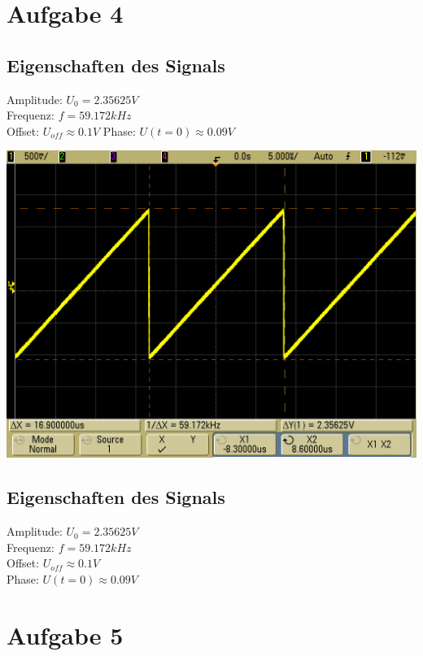\documentclass[compress,11pt]{beamer}
\begin{document}
\section{Aufgabe 4}
\begin{frame}
\subsection{Eigenschaften des Signals}
Amplitude: $U_0 = 2.35625 V$ \\
Frequenz: $f = 59.172 kHz$ \\
Offset: $U_{off} \approx 0.1 V$
Phase: $U(t=0) \approx 0.09 V$\
\end{frame}

\begin{frame}
\includegraphics[width=\textwidth]{images/scope_13}
\end{frame}
\begin{frame}
\subsection{Eigenschaften des Signals}
Amplitude: $U_0 = 2.35625 V$ \\
Frequenz: $f = 59.172 kHz$ \\
Offset: $U_{off} \approx 0.1 V$ \\
Phase: $U(t=0) \approx 0.09 V$\
\end{frame}
\section{Aufgabe 5}
\end{document}
